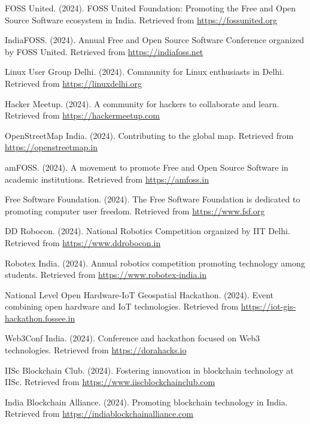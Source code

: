 \documentclass[12pt,a4paper]{article}
\begin{document}
\begin{thebibliography}{20}

FOSS United. (2024). FOSS United Foundation: Promoting the Free and Open Source Software ecosystem in India. Retrieved from \url{https://fossunited.org}

IndiaFOSS. (2024). Annual Free and Open Source Software Conference organized by FOSS United. Retrieved from \url{https://indiafoss.net}

Linux User Group Delhi. (2024). Community for Linux enthusiasts in Delhi. Retrieved from \url{https://linuxdelhi.org}

Hacker Meetup. (2024). A community for hackers to collaborate and learn. Retrieved from \url{https://hackermeetup.com}

OpenStreetMap India. (2024). Contributing to the global map. Retrieved from \url{https://openstreetmap.in}

amFOSS. (2024). A movement to promote Free and Open Source Software in academic institutions. Retrieved from \url{https://amfoss.in}

Free Software Foundation. (2024). The Free Software Foundation is dedicated to promoting computer user freedom. Retrieved from \url{https://www.fsf.org}

DD Robocon. (2024). National Robotics Competition organized by IIT Delhi. Retrieved from \url{https://www.ddrobocon.in}

Robotex India. (2024). Annual robotics competition promoting technology among students. Retrieved from \url{https://www.robotex-india.in}

National Level Open Hardware-IoT Geospatial Hackathon. (2024). Event combining open hardware and IoT technologies. Retrieved from \url{https://iot-gis-hackathon.fossee.in}


Web3Conf India. (2024). Conference and hackathon focused on Web3 technologies. Retrieved from \url{https://dorahacks.io}

IISc Blockchain Club. (2024). Fostering innovation in blockchain technology at IISc. Retrieved from \url{https://www.iiscblockchainclub.com}

India Blockchain Alliance. (2024). Promoting blockchain technology in India. Retrieved from \url{https://indiablockchainalliance.com}


\end{thebibliography}
\end{document}
